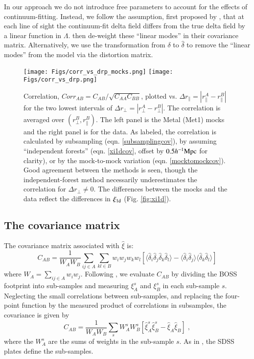 \documentclass{aa}
\newcommand{\xionedim}{\xi_{\rm 1d}}
\newcommand{\xifhat}{\hat{\xi}}
\newcommand{\dhat}{\hat\delta}
\newcommand{\hMpc}{h^{-1}{\rm Mpc}}
\newcommand{\rperp}{r_\perp}
\newcommand{\rpar}{r_\parallel}
\begin{document}
In our approach we do not introduce free parameters to account for the
effects of continuum-fitting. Instead, we follow the assumption,
first proposed by \citet{2013JCAP...04..026S}, that at each line of sight
the continuum-fit delta field differs from the true delta field
by a linear function in $\Lambda$.
\citet{2013JCAP...04..026S} then de-weight these “linear modes” in their
covariance matrix.
Alternatively, we use the transformation from $\delta$ to $\hat\delta$
to remove the “linear modes” from the model via the distortion matrix.


\begin{figure*}[t]
\centering
\texttt{[image: Figs/corr\_vs\_drp\_mocks.png]}
\texttt{[image: Figs/corr\_vs\_drp.png]}
\caption{
  Correlation,
  $Corr_{AB}=C_{AB}/\sqrt{C_{AA}C_{BB}}$, plotted vs.
$\Delta\rpar=|\rpar^A-\rpar^B|$ for the two lowest  
  intervals of $\Delta\rperp=|\rperp^A-\rperp^B|$.
  The correlation is averaged over $(\rperp^B,\rpar^B)$.
  The left panel is the  Metal (Met1) mocks and the right panel is
  for the data.
  As labeled,
the correlation is calculated by subsampling (eqn. \ref{subsamplingcov}),
by assuming ``independent forests''
(eqn. \ref{xi1dcov}, offset by $0.5\hMpc$ for clarity),
or by the mock-to-mock variation (eqn. \ref{mocktomockcov}).
Good agreement between the methods is seen, though
the independent-forest method necessarily underestimates
the correlation for $\Delta\rperp\neq0$.
The differences between the mocks and the data reflect the
differences in $\xionedim$ (Fig. \ref{fig:xi1d}).
}
\label{corrdfteq0fig}
\end{figure*}




\subsection{The covariance matrix}
\label{covmatrixsec}


The covariance matrix associated
with $\xifhat$ is:
\begin{equation}
C_{AB} =
\frac{1}{W_AW_B}
\sum_{ij\in A}\sum_{kl\in B} w_iw_j w_kw_l [
\langle \dhat_i\dhat_j \dhat_k \dhat_l \rangle
-\langle\dhat_i\dhat_j\rangle\langle\dhat_k\dhat_l\rangle
]
\label{autoautocov}
\end{equation}
where $W_A=\sum_{ij\in A}w_iw_j$.
Following \citet{2015A&A...574A..59D}, we evaluate $C_{AB}$ by dividing
the BOSS footprint into sub-samples and measuring
$\xi^s_A$ and $\xi^s_B$ in each sub-sample $s$.
Neglecting the small correlations between sub-samples,
and replacing the four-point function by the measured product
of correlations in subsamples,
the covariance is given by
\begin{equation}
C_{AB} =
\frac{1}{W_AW_B}
\sum_s W_A^sW_B^s[ \hat\xi^s_A \hat\xi^s_B - \hat\xi_A\hat\xi_B] \;,
\label{subsamplingcov}
\end{equation}
where the $W_A^s$ are the sums of weights in the sub-sample $s$.
As in \citet{2015A&A...574A..59D}, the SDSS plates  define
the sub-samples.
\end{document}
